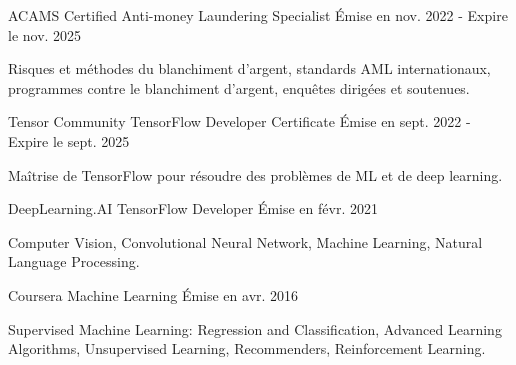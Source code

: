 
\begin{cventries}

  \cventry
    {ACAMS} %
    {Certified Anti-money Laundering Specialist} %
    {} %
    {Émise en nov. 2022 - Expire le nov. 2025} %
    {
      \begin{cvitems} %
        \item {Risques et méthodes du blanchiment d’argent, standards AML internationaux, programmes contre le blanchiment d’argent, enquêtes dirigées et soutenues.}
      \end{cvitems}
    }


  \cventry
    {Tensor Community} %
    {TensorFlow Developer Certificate} %
    {} %
    {Émise en sept. 2022 - Expire le sept. 2025} %
    {
      \begin{cvitems} %
        \item {Maîtrise de TensorFlow pour résoudre des problèmes de ML et de deep learning.}
      \end{cvitems}
    }


  \cventry
    {DeepLearning.AI} %
    {TensorFlow Developer} %
    {} %
    {Émise en févr. 2021} %
    {
      \begin{cvitems} %
        \item {Computer Vision, Convolutional Neural Network, Machine Learning, Natural Language Processing.}
      \end{cvitems}
    }


  \cventry
    {Coursera} %
    {Machine Learning} %
    {} %
    {Émise en avr. 2016} %
    {
      \begin{cvitems} %
        \item {Supervised Machine Learning: Regression and Classification, Advanced Learning Algorithms, Unsupervised Learning, Recommenders, Reinforcement Learning.}
      \end{cvitems}
    }

\end{cventries}
